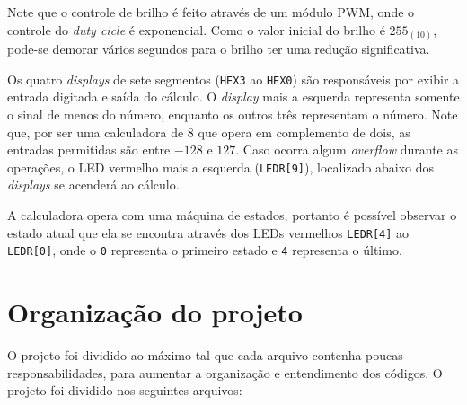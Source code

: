 \documentclass[a4paper, 12pt]{article}
\begin{document}
  Note que o controle de brilho é feito através de um módulo
  PWM, onde o controle do \emph{duty cicle} é exponencial.
  Como o valor inicial do brilho é $255_{(10)}$, pode-se
  demorar vários segundos para o brilho ter uma redução significativa.

  Os quatro \emph{displays} de sete segmentos (\texttt{HEX3} ao
  \texttt{HEX0}) são responsáveis por exibir a entrada digitada e
  saída do cálculo. O \emph{display} mais a esquerda representa 
  somente o sinal de menos do número, enquanto os outros três
  representam o número. Note que, por ser uma calculadora de
  \SI{8}{\bits} que opera em complemento de dois, as entradas
  permitidas são entre $-128$ e $127$. Caso ocorra algum 
  \emph{overflow} durante as operações, o LED vermelho mais a
  esquerda (\texttt{LEDR[9]}), localizado abaixo dos \emph{displays}
  se acenderá ao cálculo.

  A calculadora opera com uma máquina de estados, portanto é
  possível observar o estado atual que ela se encontra
  através dos LEDs vermelhos \texttt{LEDR[4]} ao \texttt{LEDR[0]},
  onde o \texttt{0} representa o primeiro estado e \texttt{4}
  representa o último.

  \section{Organização do projeto}

  O projeto foi dividido ao máximo tal que cada arquivo contenha
  poucas responsabilidades, para aumentar a organização e entendimento
  dos códigos. O projeto foi dividido nos seguintes arquivos:
\end{document}
